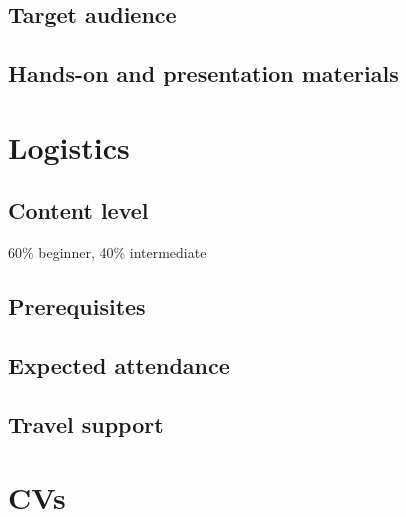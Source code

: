 \documentclass[a4paper,11pt]{article}
\begin{document}
\subsection*{Target audience}




\subsection*{Hands-on and presentation materials}


\section{Logistics}

\subsection*{Content level}
60\% beginner, 40\% intermediate

\subsection*{Prerequisites}


\subsection*{Expected attendance}


\subsection*{Travel support}

\newpage

\section{CVs}


%
\end{document}
